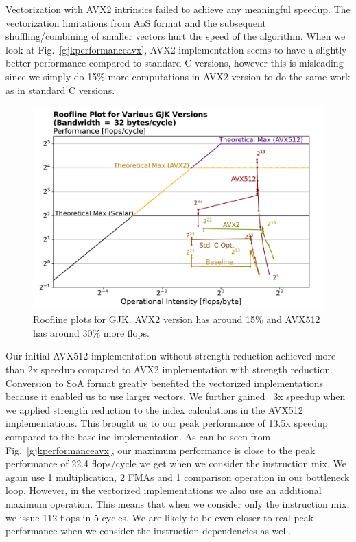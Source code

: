 \documentclass[twocolumn]{article}
\begin{document}
Vectorization with AVX2 intrinsics failed to achieve any meaningful speedup.
The vectorization limitations from AoS format and the subsequent shuffling/combining of smaller vectors hurt the speed of the algorithm. 
When we look at Fig.~\ref{gjkperformanceavx}, AVX2 implementation seems to have a slightly better performance compared to standard C versions, however this is misleading since we simply do 15\% more computations in AVX2 version to do the same work as in standard C versions.

\begin{figure}[!ht]
\includegraphics[width=\linewidth]{gjk_roofline.pdf}
\caption{ Roofline plots for GJK. AVX2 version has around 15\% and AVX512 has around 30\% more flops.}
\label{gjkroofline}
\end{figure}

Our initial AVX512 implementation without strength reduction achieved more than 2x speedup compared to AVX2 implementation with strength reduction.
Conversion to SoA format greatly benefited the vectorized implementations because it enabled us to use larger vectors. We further gained ~3x speedup when we applied strength reduction to the index calculations in the AVX512 implementations. 
This brought us to our peak performance of 13.5x speedup compared to the baseline implementation. 
As can be seen from Fig.~\ref{gjkperformanceavx}, our maximum performance is close to the peak performance of 22.4 flops/cycle we get when we consider the instruction mix. 
We again use 1 multiplication, 2 FMAs and 1 comparison operation in our bottleneck loop. 
However, in the vectorized implementations we also use an additional maximum operation. 
This means that when we consider only the instruction mix, we issue 112 flops in 5 cycles. 
We are likely to be even closer to real peak performance when we consider the instruction dependencies as well.
\end{document}
